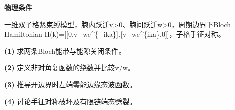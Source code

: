 \textbf{物理条件}\par 一维双子格紧束缚模型，胞内跃迁v>0、胞间跃迁w>0，周期边界下Bloch Hamiltonian H(k)=[[0,v+we\textasciicircum{}\{−ika\}],[v+we\textasciicircum{}\{ika\},0]]，子格手征对称。
\par\noindent\textbf{(1)} 求两条Bloch能带与能隙关闭条件。
\par\noindent\textbf{(2)} 定义非对角复函数的绕数并比较v/w。
\par\noindent\textbf{(3)} 推导开边界时左端零能边缘态波函数。
\par\noindent\textbf{(4)} 讨论手征对称破坏及有限链端态劈裂。
